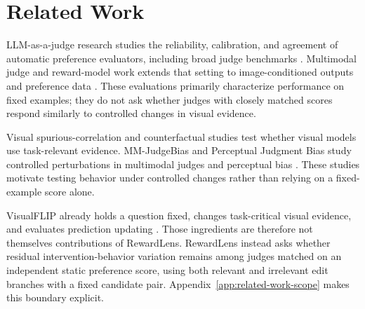 \section{Related Work}
\label{sec:related_work}

LLM-as-a-judge research studies the reliability, calibration, and agreement of
automatic preference evaluators, including broad judge benchmarks
\citep{zheng2023judging,tan2025judgebench,zhou2025jetts,yang2025reliablejudge}.
Multimodal judge and reward-model work extends that setting to
image-conditioned outputs and preference data
\citep{chen2024mllmjudge,chen2025mjbench,ko2025flexjudge,yasunaga2025multimodal,
hu2026multimodalrewardbench2,zhang2026r1reward,jin2026omnireward}.
These evaluations primarily characterize performance on fixed examples; they
do not ask whether judges with closely matched scores respond similarly to
controlled changes in visual evidence.

Visual spurious-correlation and counterfactual studies test whether visual
models use task-relevant evidence. MM-JudgeBias and Perceptual Judgment Bias
study controlled perturbations in multimodal judges and perceptual bias
\citep{li2025devil,yang2025spuriverse,gao2025scope,lee2026mmjudgebias,
park2026perceptual}. These studies motivate testing behavior under controlled
changes rather than relying on a fixed-example score alone.

VisualFLIP already holds a question fixed, changes task-critical visual
evidence, and evaluates prediction updating \citep{zhu2026visualflip}. Those
ingredients are therefore not themselves contributions of RewardLens.
RewardLens instead asks whether residual intervention-behavior variation
remains among judges matched on an independent static preference score, using
both relevant and irrelevant edit branches with a fixed candidate pair.
Appendix~\ref{app:related-work-scope} makes this boundary explicit.
